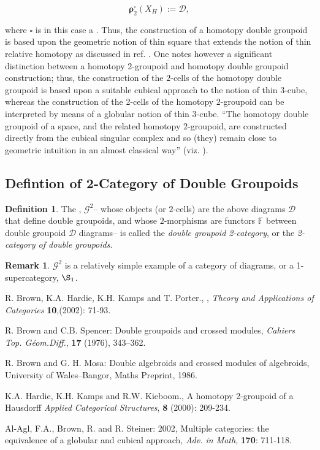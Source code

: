 \documentclass[12pt]{article}
\theoremstyle{plain}
\theoremstyle{definition}
\newtheorem{definition}{Definition}[section]
\newtheorem{remark}{Remark}[section]
\numberwithin{equation}{section}
\newcommand{\D}{\mathcal D}
\newcommand{\G}{\mathcal G}
\begin{document}
$$\boldsymbol{\rho}^{\square}_2 (X_H) := \D ,$$

where $\square$ is in this case a . Thus, the construction of a homotopy double groupoid is based upon the geometric notion of thin square that extends the notion of thin relative homotopy as discussed in ref. \cite{BHKP}. One notes however a significant distinction between a homotopy 2-groupoid and homotopy double groupoid construction; thus, the construction of the $2$-cells of the homotopy double groupoid is based upon a suitable cubical approach to the notion of thin $3$-cube, whereas the construction of the 2-cells of the homotopy $2$-groupoid can be interpreted by means of a globular notion of thin $3$-cube. ``The homotopy double groupoid of a space, and the related homotopy $2$-groupoid, are constructed directly from the cubical singular complex and so (they) remain close to geometric intuition in an almost classical way'' (viz. \cite{BHKP}).


\subsection{Defintion of 2-Category of Double Groupoids}

\begin{definition}
The , $\G^2$-- whose objects (or $2$-cells) are the above diagrams $\D$ that define double groupoids, and whose $2$-morphisms are functors $\mathbb{F}$ between double groupoid $\D$ diagrams-- is called the \emph{double groupoid 2-category}, or the \emph{2-category of double groupoids}.
\end{definition}

\begin{remark}
$\G^2$ is a relatively simple example of a category of diagrams, or a 1-supercategory, $\S_1$.
\end{remark}

\begin{thebibliography}{9}

R. Brown, K.A. Hardie, K.H. Kamps and T. Porter.,
 ,
{\it Theory and Applications of Categories} \textbf{10},(2002): 71-93.

R. Brown and C.B. Spencer: Double groupoids and crossed modules, \emph{Cahiers Top. G\'eom.Diff.},
\textbf{17} (1976), 343--362.

R. Brown and G. H. Mosa: Double algebroids and crossed modules of algebroids, University of Wales--Bangor, Maths Preprint, 1986.

K.A. Hardie, K.H. Kamps and R.W. Kieboom., A homotopy 2-groupoid of a Hausdorff
\emph{Applied Categorical Structures}, \textbf{8} (2000): 209-234.

Al-Agl, F.A., Brown, R. and R. Steiner: 2002, Multiple categories: the equivalence of a globular and cubical approach, \emph{Adv. in Math}, \textbf{170}: 711-118.

\end{thebibliography}

\end{document}
